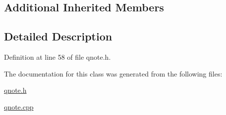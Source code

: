\subsection*{Additional Inherited Members}


\subsection{Detailed Description}


Definition at line 58 of file qnote.\+h.



The documentation for this class was generated from the following files\+:\begin{DoxyCompactItemize}
\item 
\hyperlink{qnote_8h}{qnote.\+h}\item 
\hyperlink{qnote_8cpp}{qnote.\+cpp}\end{DoxyCompactItemize}
